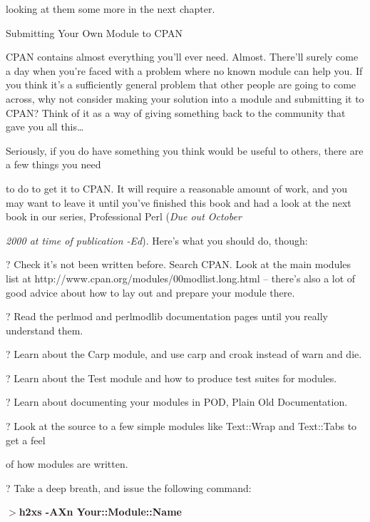 \documentclass[a4paper,11pt]{book}
\begin{document}
\noindent looking at them some more in the next chapter.

\noindent 

\noindent Submitting Your Own Module to CPAN

\noindent 

\noindent CPAN contains almost everything you'll ever need. Almost. There'll surely come a day when you're faced with a problem where no known module can help you. If you think it's a sufficiently general problem that other people are going to come across, why not consider making your solution into a module and submitting it to CPAN? Think of it as a way of giving something back to the community that gave you all this\dots 

\noindent 

\noindent Seriously, if you do have something you think would be useful to others, there are a few things you need

\noindent to do to get it to CPAN. It will require a reasonable amount of work, and you may want to leave it until you've finished this book and had a look at the next book in our series, Professional Perl (\textit{Due out October}

\noindent \textit{2000 at time of publication -Ed}). Here's what you should do, though:

\noindent 

\noindent ? Check it's not been written before. Search CPAN. Look at the main modules list at http://www.cpan.org/modules/00modlist.long.html -- there's also a lot of good advice about how to lay out and prepare your module there.

\noindent ? Read the perlmod and perlmodlib documentation pages until you really understand them.

\noindent ? Learn about the Carp module, and use carp and croak instead of warn and die.

\noindent ? Learn about the Test module and how to produce test suites for modules.

\noindent ? Learn about documenting your modules in POD, Plain Old Documentation.

\noindent ? Look at the source to a few simple modules like Text::Wrap and Text::Tabs to get a feel

\noindent of how modules are written.

\noindent ? Take a deep breath, and issue the following command:

\noindent 

\noindent $>$\textbf{h2xs -AXn Your::Module::Name}
\end{document}
